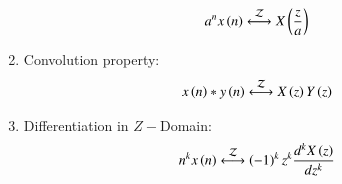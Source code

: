 \documentclass[journal,12pt,twocolumn]{IEEEtran}
\theoremstyle{remark}
\begin{document}
\begin{enumerate}
\begin{align}
        a^{n}x\left(n\right)&\overset{\mathcal{Z}}{ \longleftrightarrow}X\left(\frac{z}{a}\right)
    \end{align}
    \item Convolution property: \\
    \begin{align}
        x\left(n\right)\ast y\left(n\right)&\overset{\mathcal{Z}}{ \longleftrightarrow}X\left(z\right)Y\left(z\right)
    \end{align}
    \item Differentiation in $Z-$Domain:
    \begin{align}
        n^{k}x\left(n\right)&\overset{\mathcal{Z}}{ \longleftrightarrow}\left(-1\right)^{k}z^{k}\frac{d^{k}X\left(z\right)}{dz^{k}}
    \end{align}
\end{enumerate}
\end{document}
